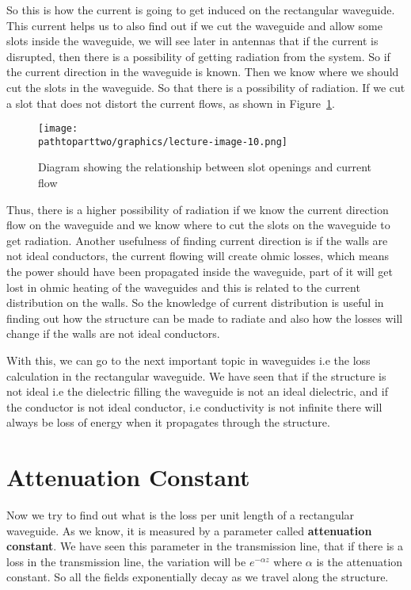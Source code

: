So this is how the current is going to get induced on the rectangular waveguide. This current helps us to also find out if we cut the waveguide and allow some slots inside the waveguide, we will see later in antennas that if the current is disrupted, then there is a possibility of getting radiation from the system. So if the current direction in the waveguide is known. Then we know where we should cut the slots in the waveguide. So that there is a possibility of radiation. If we cut a slot that does not distort the current flows, as shown in Figure~\ref{fig:lectureimage10}.
\begin{figure}[h]
\centering
\texttt{[image: \\pathtoparttwo/graphics/lecture-image-10.png]}
\caption{Diagram showing the relationship between slot openings and current flow}
\label{fig:lectureimage10}
\end{figure}

Thus, there is a higher possibility of radiation if we know the current direction flow on the waveguide and we know where to cut the slots on the waveguide to get radiation. Another usefulness of finding current direction is if the walls are not ideal conductors, the current flowing will create ohmic losses, which means the power should have been propagated inside the waveguide, part of it will get lost in ohmic heating of the waveguides and this is related to the current distribution on the walls. So the knowledge of current distribution is useful in finding out how the structure can be made to radiate and also how the losses will change if the walls are not ideal conductors.
	
With this, we can go to the next important topic in waveguides i.e the loss calculation in the rectangular waveguide. We have seen that if the structure is not ideal i.e the dielectric filling the waveguide is not an ideal dielectric, and if the conductor is not ideal conductor, i.e conductivity is not infinite there will always be loss of energy when it propagates through the structure.

\section{Attenuation Constant}
Now we try to find out what is the loss per unit length of a rectangular waveguide. As we know, it is measured by a parameter called \textbf{attenuation constant}. We have seen this parameter in the transmission line, that if there is a loss in the transmission line, the variation will be $e^{-\alpha z}$ where $\alpha$ is the attenuation constant. So all the fields exponentially decay as we travel along the structure. 

